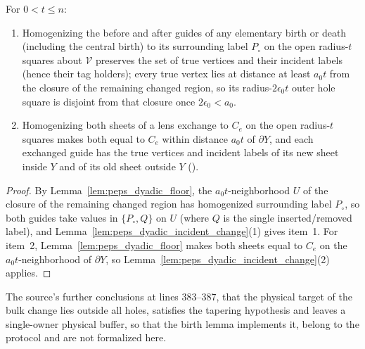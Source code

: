\begin{lemma}
    For $0<t\le n$:
    \begin{enumerate}
        \item Homogenizing the before and after guides of any elementary birth or
              death (including the central birth) to its surrounding label $P_\circ$
              on the open radius-$t$ squares about $\mathcal V$ preserves the set
              of true vertices and their incident labels (hence their tag holders);
              every true vertex lies at distance at least $a_0t$ from the closure
              of the remaining changed region, so its radius-$2\epsilon_0t$ outer
              hole square is disjoint from that closure once $2\epsilon_0<a_0$.
        \item Homogenizing both sheets of a lens exchange to $C_e$ on the open
              radius-$t$ squares makes both equal to $C_e$ within distance $a_0t$
              of $\partial Y$, and each exchanged guide has the true vertices and
              incident labels of its new sheet inside $Y$ and of its old sheet
              outside $Y$ (\cite[Section~7, lines 375--382, 389--398]{OpenAI2026PolynomialPEPS}).
    \end{enumerate}
\end{lemma}

\begin{proof}\leanok
    By Lemma~\ref{lem:peps_dyadic_floor}, the $a_0t$-neighborhood $U$ of the
    closure of the remaining changed region has homogenized surrounding label
    $P_\circ$, so both guides take values in $\{P_\circ,Q\}$ on $U$ (where $Q$ is
    the single inserted/removed label), and
    Lemma~\ref{lem:peps_dyadic_incident_change}(1) gives item~1. For item~2,
    Lemma~\ref{lem:peps_dyadic_floor} makes both sheets equal to $C_e$ on the
    $a_0t$-neighborhood of $\partial Y$, so
    Lemma~\ref{lem:peps_dyadic_incident_change}(2) applies.
\end{proof}

The source's further conclusions at lines 383--387, that the physical target of the
bulk change lies outside all holes, satisfies the tapering hypothesis and leaves a
single-owner physical buffer, so that the birth lemma implements it, belong to the
protocol and are not formalized here.

